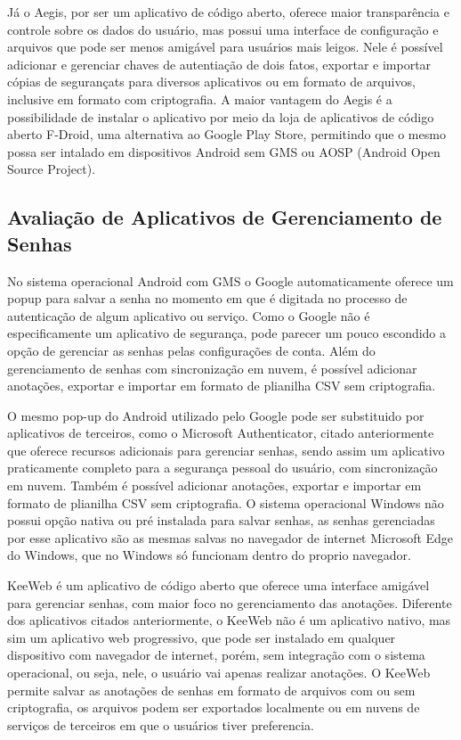 \documentclass[12pt]{article}
\begin{document}
Já o Aegis, por ser um aplicativo de código aberto, oferece maior transparência
e controle sobre os dados do usuário, mas possui uma interface de configuração
e arquivos que pode ser menos amigável para usuários mais leigos.
Nele é possível adicionar e gerenciar chaves de autentiação de dois fatos,
exportar e importar cópias de segurançats para diversos aplicativos ou em formato de arquivos,
inclusive em formato com criptografia.
A maior vantagem do Aegis é a possibilidade de instalar o aplicativo por meio da
loja de aplicativos de código aberto F-Droid, uma alternativa ao Google Play
Store, permitindo que o mesmo possa ser intalado em dispositivos Android sem GMS
ou AOSP (Android Open Source Project).

\subsection{Avaliação de Aplicativos de Gerenciamento de Senhas}

No sistema operacional Android com GMS o Google automaticamente oferece um popup
para salvar a senha no momento em que é digitada no processo de autenticação de
algum aplicativo ou serviço.
Como o Google não é especificamente um aplicativo de segurança, pode parecer um
pouco escondido a opção de gerenciar as senhas pelas configurações de conta.
Além do gerenciamento de senhas com sincronização em nuvem, é possível adicionar
anotações, exportar e importar em formato de plianilha CSV sem criptografia.

O mesmo pop-up do Android utilizado pelo Google pode ser substituido por
aplicativos de terceiros, como o Microsoft Authenticator, citado anteriormente
que oferece recursos adicionais para gerenciar senhas, sendo assim um aplicativo
praticamente completo para a segurança pessoal do usuário, com sincronização em
nuvem.
Também é possível adicionar anotações, exportar e importar em formato de
plianilha CSV sem criptografia.
O sistema operacional Windows não possui opção nativa ou pré instalada para
salvar senhas, as senhas gerenciadas por esse aplicativo são as mesmas salvas no
navegador de internet Microsoft Edge do Windows, que no Windows só funcionam
dentro do proprio navegador.

KeeWeb é um aplicativo de código aberto que oferece uma interface amigável para
gerenciar senhas, com maior foco no gerenciamento das anotações.
Diferente dos aplicativos citados anteriormente, o KeeWeb não é um aplicativo
nativo, mas sim um aplicativo web progressivo, que pode ser instalado em qualquer
dispositivo com navegador de internet, porém, sem integração com o sistema
operacional, ou seja, nele, o usuário vai apenas realizar anotações.
O KeeWeb permite salvar as anotações de senhas em formato de arquivos com ou sem
criptografia, os arquivos podem ser exportados localmente ou em nuvens de
serviços de terceiros em que o usuários tiver preferencia.
\end{document}
